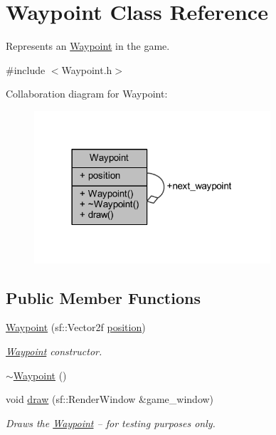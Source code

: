 \hypertarget{class_waypoint}{\section{Waypoint Class Reference}
\label{class_waypoint}
}


Represents an \hyperlink{class_waypoint}{Waypoint} in the game.  




{\ttfamily \#include $<$Waypoint.\+h$>$}



Collaboration diagram for Waypoint\+:\nopagebreak
\begin{figure}[H]
\begin{center}
\leavevmode
\includegraphics[width=249pt]{class_waypoint__coll__graph}
\end{center}
\end{figure}
\subsection*{Public Member Functions}
\begin{DoxyCompactItemize}
\item 
\hyperlink{class_waypoint_a9574a82849a3e48fce6ea8fae8da0b18}{Waypoint} (sf\+::\+Vector2f \hyperlink{class_waypoint_a17a2e50bca764db9623d8b3ccbdadd70}{position})
\begin{DoxyCompactList}\small\item\em \hyperlink{class_waypoint}{Waypoint} constructor. \end{DoxyCompactList}\item 
\hyperlink{class_waypoint_af87987c65467f66eb3955ba55e50d3db}{$\sim$\+Waypoint} ()
\item 
void \hyperlink{class_waypoint_adf35db1fa2e0667e7b7bc54573b5b287}{draw} (sf\+::\+Render\+Window \&game\+\_\+window)
\begin{DoxyCompactList}\small\item\em Draws the \hyperlink{class_waypoint}{Waypoint} -- for testing purposes only. \end{DoxyCompactList}\end{DoxyCompactItemize}
